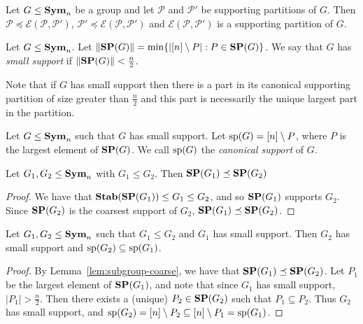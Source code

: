 \documentclass[../paper.tex]{subfiles}
\begin{document}
\begin{prop}
  Let $G \leq \text{\textbf{Sym}}_n$ be a group and let $\mathcal{P}$ and $\mathcal{P}'$ be
  supporting partitions of $G$. Then $\mathcal{P} \preceq
  \mathcal{E}(\mathcal{P}, \mathcal{P}')$, $ \mathcal{P}' \preceq
  \mathcal{E}(\mathcal{P}, \mathcal{P}')$ and $\mathcal{E}(\mathcal{P},
  \mathcal{P}')$ is a supporting partition of $G$.
  \label{prop:combining-supporting-patitions}
\end{prop}

\begin{definition}
  Let $G \leq \text{\textbf{Sym}}_n$. Let $\| \text{\textbf{SP}}(G) \| = \min \{\vert [n] \setminus P \vert :
  P \in \text{\textbf{SP}}(G) \}$. We say that $G$ has \emph{small support} if $\| \text{\textbf{SP}}(G) \| <
  \frac{n}{2}$.
\end{definition}

Note that if $G$ has small support then there is a part in its canonical
supporting partition of size greater than $\frac{n}{2}$ and this part is
necessarily the unique largest part in the partition.

\begin{definition}
  Let $G \leq \text{\textbf{Sym}}_n$ such that $G$ has small support. Let $\text{sp}(G) = [n]
  \setminus P$, where $P$ is the largest element of $\text{\textbf{SP}}(G)$. We call
  $\text{sp}(G)$ the \emph{canonical support} of $G$.
\end{definition}


\begin{lem}\label{lem:subgroup-coarse}
  Let $G_1, G_2 \leq \text{\textbf{Sym}}_n$ with $G_1 \leq G_2$. Then $\text{\textbf{SP}}(G_1) \preceq
  \text{\textbf{SP}}(G_2)$
\end{lem}
\begin{proof}
  We have that $\text{\textbf{Stab}}(\text{\textbf{SP}}(G_1)) \leq G_1 \leq G_2$, and so $\text{\textbf{SP}}(G_1)$ supports
  $G_2$. Since $\text{\textbf{SP}}(G_2)$ is the coarsest support of $G_2$, $\text{\textbf{SP}}(G_1) \preceq
  \text{\textbf{SP}}(G_2)$.
\end{proof}

\begin{lem}
  Let $G_1, G_2 \leq \text{\textbf{Sym}}_n$ such that $G_1 \leq G_2$ and $G_1$ has small
  support. Then $G_2$ has small support and $\text{sp}(G_2) \subseteq \text{sp}(G_1)$.
  \label{lem:support-containment}
\end{lem}
\begin{proof}
  By Lemma~\ref{lem:subgroup-coarse}, we have that $\text{\textbf{SP}}(G_1) \preceq \text{\textbf{SP}}(G_2)$.
  Let $P_1$ be the largest element of $\text{\textbf{SP}}(G_1)$, and note that since $G_1$ has
  small support, $\vert P_1 \vert > \frac{n}{2}$. Then there exists a (unique)
  $P_2 \in \text{\textbf{SP}}(G_2)$ such that $P_1 \subseteq P_2$. Thus $G_2$ has small
  support, and $\text{sp}(G_2) = [n] \setminus P_2 \subseteq [n] \setminus P_1 =
  \text{sp}(G_1)$.
\end{proof}
\end{document}
